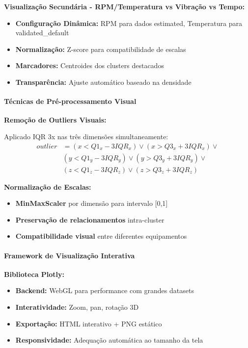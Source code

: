 \textbf{Visualização Secundária - RPM/Temperatura vs Vibração vs Tempo:}

\begin{itemize}
    \item \textbf{Configuração Dinâmica:} RPM para dados estimated, Temperatura para validated\_default
    \item \textbf{Normalização:} Z-score para compatibilidade de escalas
    \item \textbf{Marcadores:} Centroides dos clusters destacados
    \item \textbf{Transparência:} Ajuste automático baseado na densidade
\end{itemize}

\paragraph{Técnicas de Pré-processamento Visual}

\textbf{Remoção de Outliers Visuais:}

Aplicado IQR 3x nas três dimensões simultaneamente:
\begin{align}
outlier &= (x < Q1_x - 3IQR_x) \lor (x > Q3_x + 3IQR_x) \lor \\
         & (y < Q1_y - 3IQR_y) \lor (y > Q3_y + 3IQR_y) \lor \\
         & (z < Q1_z - 3IQR_z) \lor (z > Q3_z + 3IQR_z)
\end{align}

\textbf{Normalização de Escalas:}

\begin{itemize}
    \item \textbf{MinMaxScaler} por dimensão para intervalo [0,1]
    \item \textbf{Preservação de relacionamentos} intra-cluster
    \item \textbf{Compatibilidade visual} entre diferentes equipamentos
\end{itemize}

\paragraph{Framework de Visualização Interativa}

\textbf{Biblioteca Plotly:}

\begin{itemize}
    \item \textbf{Backend:} WebGL para performance com grandes datasets
    \item \textbf{Interatividade:} Zoom, pan, rotação 3D
    \item \textbf{Exportação:} HTML interativo + PNG estático
    \item \textbf{Responsividade:} Adequação automática ao tamanho da tela
\end{itemize}

